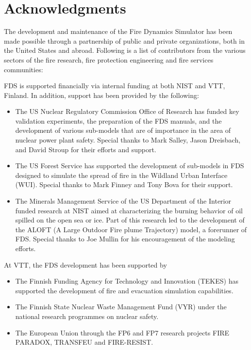 \documentclass[11pt]{book}
\begin{document}
\chapter{Acknowledgments}

\label{acksection}

The development and maintenance of the Fire Dynamics Simulator has been made possible through
a partnership of public and private organizations, both in the United States and abroad. Following
is a list of contributors from the various sectors of the fire research, fire protection engineering and
fire services communities:

FDS is supported financially via internal funding at both NIST and VTT, Finland. In addition, support has been provided by the following:
\begin{itemize}
\item The US Nuclear Regulatory Commission Office of Research has funded key validation experiments, the preparation of the FDS manuals, and the development of various sub-models that are of importance in the area of nuclear power plant safety. Special thanks to Mark Salley, Jason Dreisbach, and David Stroup for their efforts and support.
\item The US Forest Service has supported the development of sub-models in FDS designed to simulate the spread of fire in the Wildland Urban Interface (WUI). Special thanks to Mark Finney and Tony Bova for their support.
\item The Minerals Management Service of the US Department of the Interior funded research at NIST aimed at characterizing the burning behavior of oil spilled on the open sea or ice. Part of this research led to the development of the ALOFT (A Large Outdoor Fire plume Trajectory) model, a forerunner of FDS. Special thanks to Joe Mullin for his encouragement of the modeling efforts.
\end{itemize}
\noindent At VTT, the FDS development has been supported by
\begin{itemize}
\item The Finnish Funding Agency for Technology and Innovation (TEKES) has supported the development of fire and evacuation simulation capabilities.
\item The Finnish State Nuclear Waste Management Fund (VYR) under the national research programmes on nuclear safety.
\item The European Union through the FP6 and FP7 research projects FIRE PARADOX, TRANSFEU and FIRE-RESIST.
\end{itemize}
\end{document}
